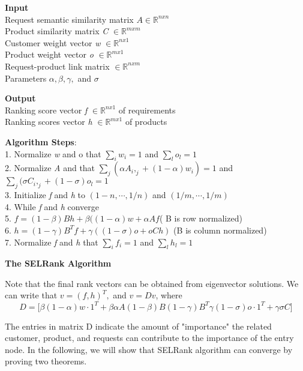 \documentclass[sigconf]{acmart}
\begin{document}
\begin{algorithm}
\textbf{Input}\\
Request semantic similarity matrix $A \in \mathbb{R}^{n x n}$\\
Product similarity matrix \textit{C} $\in \mathbb{R}^{m x m}$\\
Customer weight vector \textit{w} $\in \mathbb{R}^{n x 1}$\\
Product weight vector \textit{o} $\in \mathbb{R}^{m x 1}$\\
Request-product link matrix  $\in \mathbb{R}^{n x m}$\\
Parameters $\alpha, \beta, \gamma,$ and $\sigma$

\textbf{Output}\\
Ranking score vector \textit{f} $\in \mathbb{R}^{n x 1}$ of requirements\\
Ranking scores vector \textit{h} $\in \mathbb{R}^{m x 1}$ of products

\textbf{Algorithm Steps}:\\
1. Normalize \textit{w} and o that $\sum_i{w_i = 1}$ and $\sum_l o_l = 1$\\
2. Normalize \textit{A} and  that $\sum_j(\alpha A_i,_j + (1 - \alpha)w_i) = 1$ and $\sum_j(\sigma C_i,_j + (1-\sigma)o_l = 1$\\
3. Initialize \textit{f} and \textit{h} to $(1-n, \cdots , 1/n)$ and $(1/m, \cdots , 1/m)$\\
4. While \textit{f} and \textit{h} converge\\
5. $f = (1-\beta)Bh + \beta((1-\alpha)w + \alpha A f$( B is row normalized)\\
6. $h = (1-\gamma)B^T f+\gamma((1- \sigma)o + oCh)$ (B is column normalized)\\
7. Normalize \textit{f} and \textit{h} that $\sum_i f_i = 1$ and $\sum_l h_l = 1$
     \caption{{\bf The SELRank Algorithm} \label{Algorithm 1}}
\end{algorithm}

Note that the final rank vectors can be obtained from eigenvector solutions. We can write that $v=(f,h)^T,$ and $v = Dv$, where $$D=\Bigg[{\beta(1-\alpha)w \cdot 1^T + \beta \alpha A } {(1-\beta) B} {(1-\gamma)B^T } {\gamma(1-\sigma)o \cdot 1^T + \gamma \sigma C}\Bigg]$$

The entries in matrix D indicate the amount of "importance" the related customer, product, and requests can contribute to the importance of the entry node. In the following, we will show that SELRank algorithm can converge by proving two theorems. 
\end{document}
